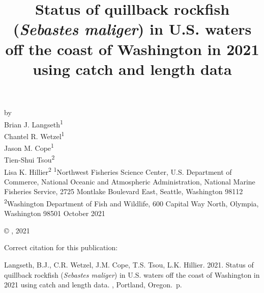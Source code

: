 \documentclass[11pt,
  english,
  letterpaper,
]{article}
\date{}
\newcommand{\trTitle}{Status of quillback rockfish (\emph{Sebastes maliger}) in U.S. waters off the coast of Washington in 2021 using catch and length data}
\newcommand{\trYear}{2021}
\newcommand{\trMonth}{October}
\newcommand{\trAuthsBack}{Langseth, B.J., C.R. Wetzel, J.M. Cope, T.S. Tsou, L.K. Hillier}
\newcommand{\trCitation}{
\begin{hangparas}{1em}{1}
\trAuthsBack{}. \trYear{}. \trTitle{}. \glsentrylong{pfmc}, Portland, Oregon. \pageref{LastPage}{}\,p.
\end{hangparas}}
\begin{document}

\renewcommand*{\thefootnote}{\fnsymbol{footnote}}

\small
\thispagestyle{empty}
\noindent
\begin{center}
\title{Status of quillback rockfish (\emph{Sebastes maliger}) in U.S. waters off the coast of Washington in 2021 using catch and length data}
\vspace{1.5cm}
{\Large\textbf{}}
\vfill
by\\
Brian J. Langseth\textsuperscript{1}\\
Chantel R. Wetzel\textsuperscript{1}\\
Jason M. Cope\textsuperscript{1}\\
Tien-Shui Tsou\textsuperscript{2}\\
Lisa K. Hillier\textsuperscript{2}\vfill
\textsuperscript{1}Northwest Fisheries Science Center, U.S. Department of Commerce, National Oceanic and Atmospheric Administration, National Marine Fisheries Service, 2725 Montlake Boulevard East, Seattle, Washington 98112\\
\textsuperscript{2}Washington Department of Fish and Wildlife, 600 Capital Way North, Olympia, Washington 98501\vfill
\trMonth{} \trYear{}
\end{center}
\clearpage

\thispagestyle{empty}
\vspace*{\fill}
\begin{center}
\copyright{} , \trYear{}\\
\end{center}
\par
\bigskip
\noindent
Correct citation for this publication:
\bigskip
\par
\trCitation{}
\clearpage


\tableofcontents\clearpage
\label{TRlastRoman}
\clearpage

\newpage
\thispagestyle{empty} %

\pagestyle{plain}  %
\renewcommand*{\thefootnote}{\arabic{footnote}}  %
\setcounter{footnote}{0}  %
\renewcommand{\headrulewidth}{0.5pt}
\renewcommand{\footrulewidth}{0.5pt}
\end{document}
